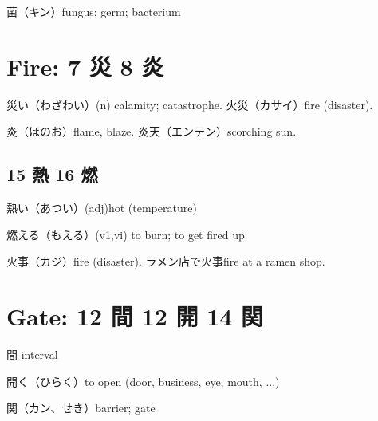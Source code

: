 菌（キン）fungus; germ; bacterium

\section{Fire: 7 災 8 炎}

災い（わざわい）(n) calamity; catastrophe.
火災（カサイ）fire (disaster).

炎（ほのお）flame, blaze.
炎天（エンテン）scorching sun.

\subsection{15 熱 16 燃}

熱い（あつい）(adj)hot (temperature)

燃える（もえる）(v1,vi) to burn; to get fired up

火事（カジ）fire (disaster).
ラメン店で火事fire at a ramen shop.

\section{Gate: 12 間 12 開 14 関}

間 interval

開く（ひらく）to open (door, business, eye, mouth, ...)

関（カン、せき）barrier; gate
